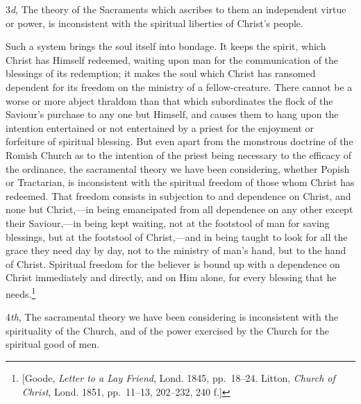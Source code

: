 \documentclass[english,]{book}
\begin{document}
3\emph{d}, The theory of the Sacraments which ascribes to them an independent virtue or power, is inconsistent with the spiritual liberties of Christ's people.

Such a system brings the soul itself into bondage. It keeps the spirit, which Christ has Himself redeemed, waiting upon man for the communication of the blessings of its redemption; it makes the soul which Christ has ransomed dependent for its freedom on the ministry of a fellow-creature. There cannot be a worse or more abject thraldom than that which subordinates the flock of the Saviour's purchase to any one but Himself, and causes them to hang upon the intention entertained or not entertained by a priest for the enjoyment or forfeiture of spiritual blessing. But even apart from the monstrous doctrine of the Romish Church as to the intention of the priest being necessary to the efficacy of the ordinance, the sacramental theory we have been considering, whether Popish or Tractarian, is inconsistent with the spiritual freedom of those whom Christ has redeemed. That freedom consists in subjection to and dependence on Christ, and none but Christ,---in being emancipated from all dependence on any other except their Saviour,---in being kept waiting, not at the footstool of man for saving blessings, but at the footstool of Christ,---and in being taught to look for all the grace they need day by day, not to the ministry of man's hand, but to the hand of Christ. Spiritual freedom for the believer is bound up with a dependence on Christ immediately and directly, and on Him alone, for every blessing that he needs.\footnote{{[}Goode, \emph{Letter to a Lay Friend}, Lond. 1845, pp.~18--24. Litton, \emph{Church of Christ}, Lond. 1851, pp.~11--13, 202--232, 240 f.{]}}

4\emph{th}, The sacramental theory we have been considering is inconsistent with the spirituality of the Church, and of the power exercised by the Church for the spiritual good of men.
\end{document}
